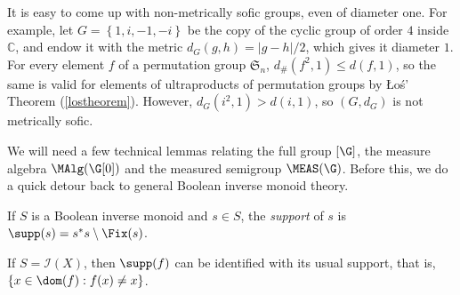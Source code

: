 \begin{example}
It is easy to come up with non-metrically sofic groups, even of diameter one. For example, let $G=\left\{1,i,-1,-i\right\}$ be the copy of the cyclic group of order $4$ inside $\mathbb{C}$, and endow it with the metric $d_G(g,h)=|g-h|/2$, which gives it diameter $1$. For every element $f$ of a permutation group $\mathfrak{S}_n$, $d_\#(f^2,1)\leq d(f,1)$, so the same is valid for elements of ultraproducts of permutation groups by \L o\'{s}' Theorem (\ref{lostheorem}). However, $d_G(i^2,1)>d(i,1)$, so $(G,d_G)$ is not metrically sofic.
\end{example}

We will need a few technical lemmas relating the full group $[\G]$, the measure algebra $\MAlg(\G[0])$ and the measured semigroup $\MEAS(\G)$. Before this, we do a quick detour back to general Boolean inverse monoid theory.

\begin{definition}
If $S$ is a Boolean inverse monoid and $s\in S$, the \emph{support} of $s$ is $\supp(s)=s^*s\setminus\Fix(s)$.
\end{definition}

\begin{example}\label{examplesupportix}
If $S=\mathcal{I}(X)$, then $\supp(f)$ can be identified with its usual support, that is, $\left\{x\in\dom(f):f(x)\neq x\right\}$.
\end{example}

